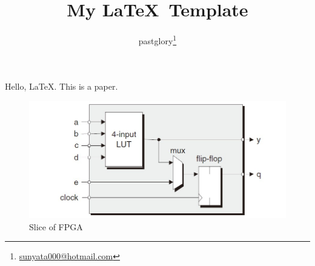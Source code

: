 \documentclass[zh]{report}
\title {My \LaTeX\ Template}
\author{pastglory\thanks{\href{mailto:sunyata000@hotmail.com}{sunyata000@hotmail.com}}}
\begin{document}
\maketitle

Hello, \LaTeX.
This is a paper\cite{zhang2020sparch}.

\begin{figure}[H] %
    \centering
    \includegraphics{img/FPGA.jpg}
    \caption{Slice of FPGA} %
    \label{图1} %
\end{figure}


\end{document}
